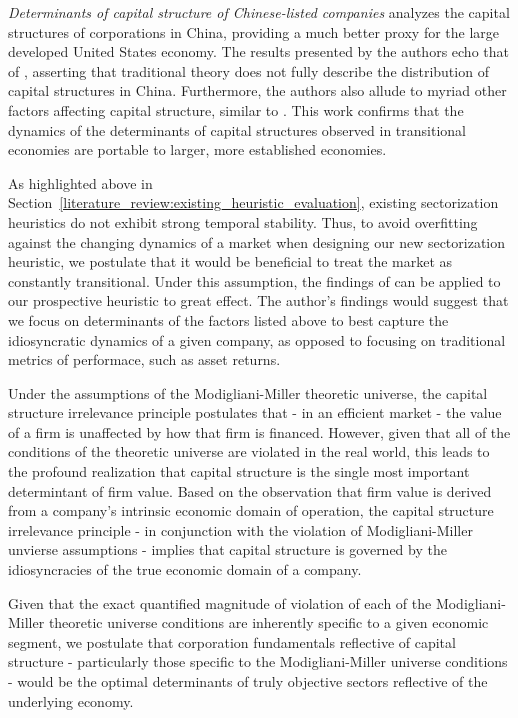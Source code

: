 \documentclass[../main.tex]{subfiles}
\begin{document}
\textit{Determinants of capital structure of Chinese-listed companies} analyzes the capital structures of corporations in China, providing a much better proxy for the large developed United States economy. The results presented by the authors echo that of \citeauthor{Delcoure2007TheEconomies}, asserting that traditional theory does not fully describe the distribution of capital structures in China. Furthermore, the authors also allude to myriad other factors affecting capital structure, similar to \citeauthor{Delcoure2007TheEconomies}. This work confirms that the dynamics of the determinants of capital structures observed in transitional economies are portable to larger, more established economies.

As highlighted above in Section~\ref{literature_review:existing_heuristic_evaluation}, existing sectorization heuristics do not exhibit strong temporal stability. Thus, to avoid overfitting against the changing dynamics of a market when designing our new sectorization heuristic, we postulate that it would be beneficial to treat the market as constantly transitional. Under this assumption, the findings of \citeauthor{Delcoure2007TheEconomies} can be applied to our prospective heuristic to great effect. The author's findings would suggest that we focus on determinants of the factors listed above to best capture the idiosyncratic dynamics of a given company, as opposed to focusing on traditional metrics of performace, such as asset returns.

Under the assumptions of the Modigliani-Miller theoretic universe, the capital structure irrelevance principle postulates that - in an efficient market - the value of a firm is unaffected by how that firm is financed. However, given that all of the conditions of the theoretic universe are violated in the real world, this leads to the profound realization that capital structure is the single most important determintant of firm value. Based on the observation that firm value is derived from a company's intrinsic economic domain of operation, the capital structure irrelevance principle - in conjunction with the violation of Modigliani-Miller unvierse assumptions - implies that capital structure is governed by the idiosyncracies of the true economic domain of a company.

Given that the exact quantified magnitude of violation of each of the Modigliani-Miller theoretic universe conditions are inherently specific to a given economic segment, we postulate that corporation fundamentals reflective of capital structure - particularly those specific to the Modigliani-Miller universe conditions - would be the optimal determinants of truly objective sectors reflective of the underlying economy.
\end{document}
